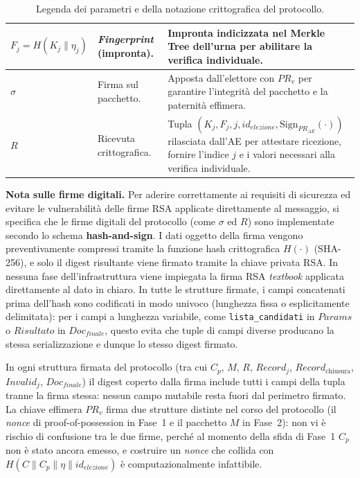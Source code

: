 \begin{table}[H]
\begin{tabular}{|l|p{4.5cm}|p{7.5cm}|}
$F_j = H(K_j \parallel \eta_j)$ & \textit{Fingerprint} (impronta). & Impronta indicizzata nel Merkle Tree dell'urna per abilitare la verifica individuale. \\ \hline
$\sigma$ & Firma sul pacchetto. & Apposta dall'elettore con $PR_v$ per garantire l'integrità del pacchetto e la paternità effimera. \\ \hline
$R$ & Ricevuta crittografica. & Tupla $(K_j, F_j, j, id_{elezione}, \text{Sign}_{PR_{AE}}(\cdot))$ rilasciata dall'AE per attestare ricezione, fornire l'indice $j$ e i valori necessari alla verifica individuale. \\ \hline
\end{tabular}
\caption{Legenda dei parametri e della notazione crittografica del protocollo.}
\label{tab:parametri_notazione}
\end{table}

\textbf{Nota sulle firme digitali.} Per aderire correttamente ai requisiti di sicurezza ed evitare le vulnerabilità delle firme RSA applicate direttamente al messaggio, si specifica che le firme digitali del protocollo (come $\sigma$ ed $R$) sono implementate secondo lo schema \textbf{hash-and-sign}. I dati oggetto della firma vengono preventivamente compressi tramite la funzione hash crittografica $H(\cdot)$ (SHA-256), e solo il digest risultante viene firmato tramite la chiave privata RSA. In nessuna fase dell'infrastruttura viene impiegata la firma RSA \textit{textbook} applicata direttamente al dato in chiaro. In tutte le strutture firmate, i campi concatenati prima dell'hash sono codificati in modo univoco (lunghezza fissa o esplicitamente delimitata): per i campi a lunghezza variabile, come \texttt{lista\_candidati} in $Params$ o $Risultato$ in $Doc_{finale}$, questo evita che tuple di campi diverse producano la stessa serializzazione e dunque lo stesso digest firmato.

In ogni struttura firmata del protocollo (tra cui $C_p$, $M$, $R$, $Record_j$, $Record_{\text{chiusura}}$, $Invalid_j$, $Doc_{finale}$) il digest coperto dalla firma include tutti i campi della tupla tranne la firma stessa: nessun campo mutabile resta fuori dal perimetro firmato. La chiave effimera $PR_v$ firma due strutture distinte nel corso del protocollo (il \textit{nonce} di proof-of-possession in Fase~1 e il pacchetto $M$ in Fase~2): non vi è rischio di confusione tra le due firme, perché al momento della sfida di Fase~1 $C_p$ non è stato ancora emesso, e costruire un \textit{nonce} che collida con $H(C \parallel C_p \parallel \eta \parallel id_{elezione})$ è computazionalmente infattibile.

